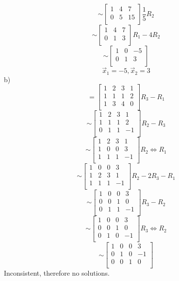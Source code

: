 \documentclass[12pt]{article}
\begin{document}
	\[\sim
		\left[
		\begin{array}{cc|c}
		1 & 4 & 7 \\
		0 & 5 & 15\\
		\end{array}
		\right] \frac{1}{5} R_2
	\]
	\[\sim
		\left[
		\begin{array}{cc|c}
		1 & 4 & 7 \\
		0 & 1 & 3\\
		\end{array}
		\right] R_1 - 4R_2
	\]
	\[\sim
		\left[
		\begin{array}{cc|c}
		1 & 0 & -5 \\
		0 & 1 & 3\\
		\end{array}
		\right]
	\]
	\[\vec x_1 = -5,  \vec x_2 = 3\]
b)\\
	\[= 
		\left[
		\begin{array}{ccc|c}
		1 & 2 & 3 & 1 \\
		1 & 1 & 1 & 2\\
		1 & 3 & 4 & 0\\
		\end{array}
		\right] R_3 - R_1
	\]
	\[\sim 
		\left[
		\begin{array}{ccc|c}
		1 & 2 & 3 & 1 \\
		1 & 1 & 1 & 2\\
		0 & 1 & 1 & -1\\
		\end{array}
		\right] R_2 - R_3
	\]
	\[\sim 
		\left[
		\begin{array}{ccc|c}
		1 & 2 & 3 & 1 \\
		1 & 0 & 0 & 3\\
		1 & 1 & 1 & -1\\
		\end{array}
		\right] R_2 \Leftrightarrow R_1
	\]
	\[\sim 
		\left[
		\begin{array}{ccc|c}
		1 & 0 & 0 & 3 \\
		1 & 2 & 3 & 1\\
		1 & 1 & 1 & -1\\
		\end{array}
		\right] R_2 - 2R_3 - R_1
	\]
	\[\sim
		\left[
		\begin{array}{ccc|c}
		1 & 0 & 0 & 3 \\
		0 & 0 & 1 & 0\\
		0 & 1 & 1 & -1\\
		\end{array}
		\right] R_3 - R_2
	\]
	\[\sim
		\left[
		\begin{array}{ccc|c}
		1 & 0 & 0 & 3 \\
		0 & 0 & 1 & 0\\
		0 & 1 & 0 & -1\\
		\end{array}
		\right] R_3 \Leftrightarrow R_2
	\]
	\[\sim
		\left[
		\begin{array}{ccc|c}
		1 & 0 & 0 & 3 \\
		0 & 1 & 0 & -1\\
		0 & 0 & 1 & 0\\
		\end{array}
		\right]
	\]
Inconsistent, therefore no solutions.\\
\end{document}
